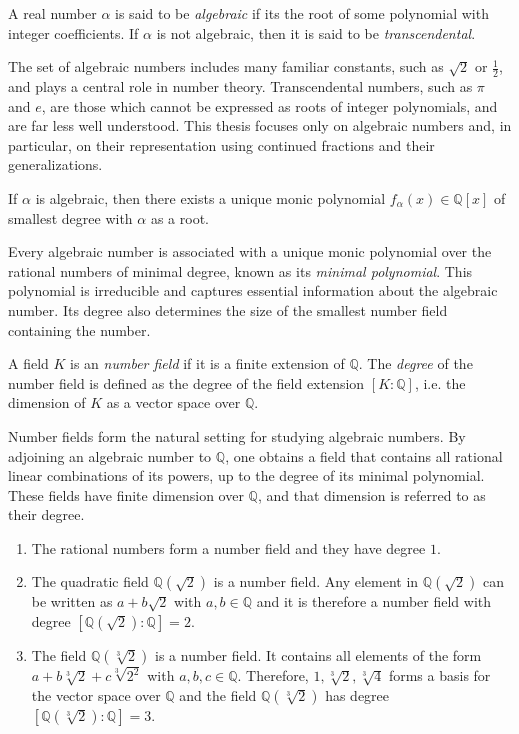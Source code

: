 \begin{definition}
  A real number $α$ is said to be \emph{algebraic} if its the root of some polynomial
  with integer coefficients.
  If $α$ is not algebraic, then it is said to be \emph{transcendental}.
\end{definition}

The set of algebraic numbers includes many familiar constants, such as $\sqrt{2}$ or $\frac{1}{2}$,
and plays a central role in number theory.
Transcendental numbers, such as $\pi$ and $e$, are those which cannot be expressed
as roots of integer polynomials, and are far less well understood.
This thesis focuses only on algebraic numbers and, in particular, on their
representation using continued fractions and their generalizations.

\begin{lemma}
  If $α$ is algebraic, then there exists a unique monic polynomial $f_α(x) ∈ ℚ[x]$
  of smallest degree with $α$ as a root.
\end{lemma}

Every algebraic number is associated with a unique monic polynomial over the rational numbers
of minimal degree, known as its \emph{minimal polynomial}.
This polynomial is irreducible and captures essential information about the algebraic number.
Its degree also determines the size of the smallest number field containing the number.

\begin{definition}
  A field $K$ is an \emph{number field} if it is a finite extension of $ℚ$.
  The \emph{degree} of the number field is defined as the degree of the field
  extension $[K : ℚ]$, i.e. the dimension of $K$ as a vector space over $ℚ$.
\end{definition}

Number fields form the natural setting for studying algebraic numbers.
By adjoining an algebraic number to $ℚ$, one obtains a field that contains all
rational linear combinations of its powers, up to the degree of its minimal polynomial.
These fields have finite dimension over $ℚ$, and that dimension is referred to as their degree.

\begin{example}
  \hfill
  \begin{enumerate}
    \item The rational numbers form a number field and they have degree $1$.
    \item The quadratic field $ℚ(\sqrt{2})$ is a number field.
      Any element in $ ℚ(\sqrt{2})$ can be written as $a + b \sqrt{2}$ with $a,b ∈ ℚ$
      and it is therefore a number field with degree $[ℚ(\sqrt{2}) : ℚ] = 2$.
    \item The field $ℚ(\sqrt[3]{2})$ is a number field.
      It contains all elements of the form $a + b \sqrt[3]{2} + c \sqrt[3]{2^2}$ with $a,b,c ∈ ℚ$.
      Therefore, $1, \sqrt[3]{{2}}, \sqrt[3]{4}$ forms a basis for the vector space over $ℚ$
      and the field $ℚ(\sqrt[3]{2})$ has degree $[ℚ(\sqrt[3]{2}) : ℚ] = 3$.
  \end{enumerate}
\end{example}

